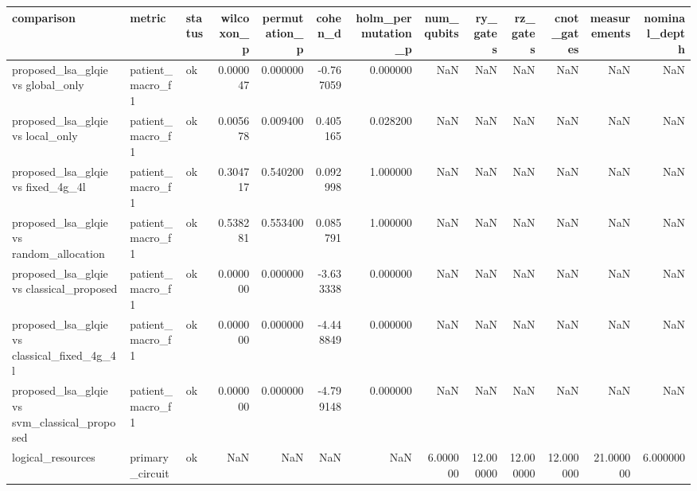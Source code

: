 \begin{tabular}{lllrrrrrrrrrr}
\toprule
comparison & metric & status & wilcoxon_p & permutation_p & cohen_d & holm_permutation_p & num_qubits & ry_gates & rz_gates & cnot_gates & measurements & nominal_depth \\
\midrule
proposed_lsa_glqie vs global_only & patient_macro_f1 & ok & 0.000047 & 0.000000 & -0.767059 & 0.000000 & NaN & NaN & NaN & NaN & NaN & NaN \\
proposed_lsa_glqie vs local_only & patient_macro_f1 & ok & 0.005678 & 0.009400 & 0.405165 & 0.028200 & NaN & NaN & NaN & NaN & NaN & NaN \\
proposed_lsa_glqie vs fixed_4g_4l & patient_macro_f1 & ok & 0.304717 & 0.540200 & 0.092998 & 1.000000 & NaN & NaN & NaN & NaN & NaN & NaN \\
proposed_lsa_glqie vs random_allocation & patient_macro_f1 & ok & 0.538281 & 0.553400 & 0.085791 & 1.000000 & NaN & NaN & NaN & NaN & NaN & NaN \\
proposed_lsa_glqie vs classical_proposed & patient_macro_f1 & ok & 0.000000 & 0.000000 & -3.633338 & 0.000000 & NaN & NaN & NaN & NaN & NaN & NaN \\
proposed_lsa_glqie vs classical_fixed_4g_4l & patient_macro_f1 & ok & 0.000000 & 0.000000 & -4.448849 & 0.000000 & NaN & NaN & NaN & NaN & NaN & NaN \\
proposed_lsa_glqie vs svm_classical_proposed & patient_macro_f1 & ok & 0.000000 & 0.000000 & -4.799148 & 0.000000 & NaN & NaN & NaN & NaN & NaN & NaN \\
logical_resources & primary_circuit & ok & NaN & NaN & NaN & NaN & 6.000000 & 12.000000 & 12.000000 & 12.000000 & 21.000000 & 6.000000 \\
\bottomrule
\end{tabular}
